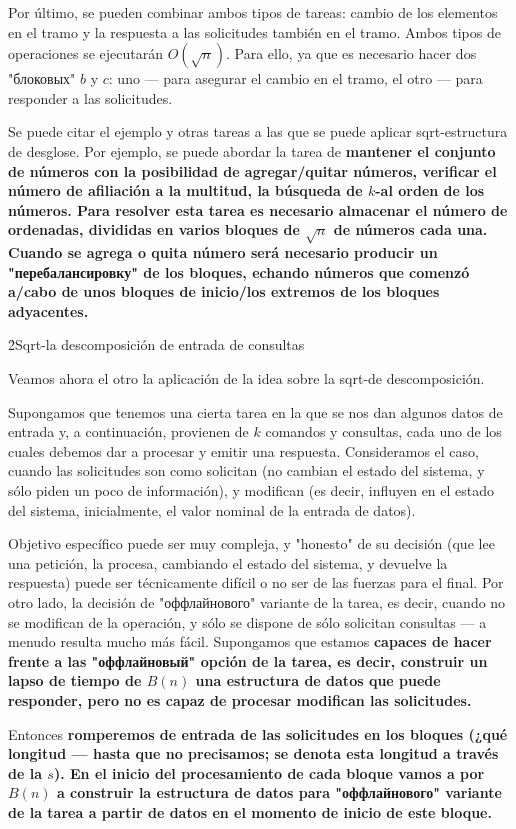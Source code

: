 Por último, se pueden combinar ambos tipos de tareas: cambio de los elementos en el tramo y la respuesta a las solicitudes también en el tramo. Ambos tipos de operaciones se ejecutarán $O(\sqrt{n})$. Para ello, ya que es necesario hacer dos "блоковых" $b$ y $c$: uno --- para asegurar el cambio en el tramo, el otro --- para responder a las solicitudes.

Se puede citar el ejemplo y otras tareas a las que se puede aplicar sqrt-estructura de desglose. Por ejemplo, se puede abordar la tarea de \bf{mantener el conjunto de números} con la posibilidad de agregar/quitar números, verificar el número de afiliación a la multitud, la búsqueda de $k$-al orden de los números. Para resolver esta tarea es necesario almacenar el número de ordenadas, divididas en varios bloques de $\sqrt{n}$ de números cada una. Cuando se agrega o quita número será necesario producir un "перебалансировку" de los bloques, echando números que comenzó a/cabo de unos bloques de inicio/los extremos de los bloques adyacentes.


\h2{Sqrt-la descomposición de entrada de consultas}

Veamos ahora el otro la aplicación de la idea sobre la sqrt-de descomposición.

Supongamos que tenemos una cierta tarea en la que se nos dan algunos datos de entrada y, a continuación, provienen de $k$ comandos y consultas, cada uno de los cuales debemos dar a procesar y emitir una respuesta. Consideramos el caso, cuando las solicitudes son como solicitan (no cambian el estado del sistema, y sólo piden un poco de información), y modifican (es decir, influyen en el estado del sistema, inicialmente, el valor nominal de la entrada de datos).

Objetivo específico puede ser muy compleja, y "honesto" de su decisión (que lee una petición, la procesa, cambiando el estado del sistema, y devuelve la respuesta) puede ser técnicamente difícil o no ser de las fuerzas para el final. Por otro lado, la decisión de "оффлайнового" variante de la tarea, es decir, cuando no se modifican de la operación, y sólo se dispone de sólo solicitan consultas --- a menudo resulta mucho más fácil. Supongamos que estamos \bf{capaces de hacer frente a las "оффлайновый" opción} de la tarea, es decir, construir un lapso de tiempo de $B(n)$ una estructura de datos que puede responder, pero no es capaz de procesar modifican las solicitudes.

Entonces \bf{romperemos de entrada de las solicitudes en los bloques} (¿qué longitud --- hasta que no precisamos; se denota esta longitud a través de la $s$). En el inicio del procesamiento de cada bloque vamos a por $B(n)$ a construir la estructura de datos para "оффлайнового" variante de la tarea a partir de datos en el momento de inicio de este bloque.

